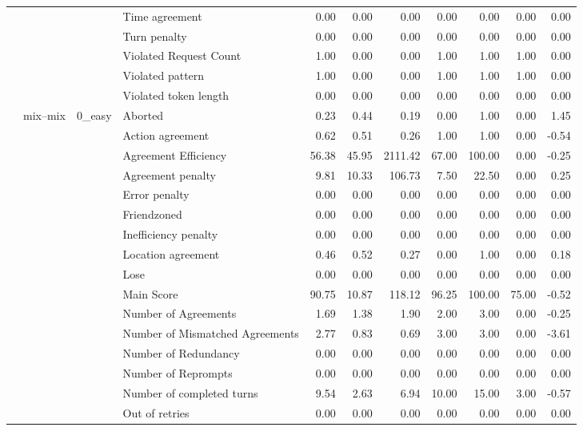 \begin{tabular}{llllrrrrrrr}
 &  &  & Time agreement & 0.00 & 0.00 & 0.00 & 0.00 & 0.00 & 0.00 & 0.00 \\
 &  &  & Turn penalty & 0.00 & 0.00 & 0.00 & 0.00 & 0.00 & 0.00 & 0.00 \\
 &  &  & Violated Request Count & 1.00 & 0.00 & 0.00 & 1.00 & 1.00 & 1.00 & 0.00 \\
 &  &  & Violated pattern & 1.00 & 0.00 & 0.00 & 1.00 & 1.00 & 1.00 & 0.00 \\
 &  &  & Violated token length & 0.00 & 0.00 & 0.00 & 0.00 & 0.00 & 0.00 & 0.00 \\
\cline{2-11} \cline{3-11}
 & \multirow[t]{216}{*}{mix--mix} & \multirow[t]{27}{*}{0_easy} & Aborted & 0.23 & 0.44 & 0.19 & 0.00 & 1.00 & 0.00 & 1.45 \\
 &  &  & Action agreement & 0.62 & 0.51 & 0.26 & 1.00 & 1.00 & 0.00 & -0.54 \\
 &  &  & Agreement Efficiency & 56.38 & 45.95 & 2111.42 & 67.00 & 100.00 & 0.00 & -0.25 \\
 &  &  & Agreement penalty & 9.81 & 10.33 & 106.73 & 7.50 & 22.50 & 0.00 & 0.25 \\
 &  &  & Error penalty & 0.00 & 0.00 & 0.00 & 0.00 & 0.00 & 0.00 & 0.00 \\
 &  &  & Friendzoned & 0.00 & 0.00 & 0.00 & 0.00 & 0.00 & 0.00 & 0.00 \\
 &  &  & Inefficiency penalty & 0.00 & 0.00 & 0.00 & 0.00 & 0.00 & 0.00 & 0.00 \\
 &  &  & Location agreement & 0.46 & 0.52 & 0.27 & 0.00 & 1.00 & 0.00 & 0.18 \\
 &  &  & Lose & 0.00 & 0.00 & 0.00 & 0.00 & 0.00 & 0.00 & 0.00 \\
 &  &  & Main Score & 90.75 & 10.87 & 118.12 & 96.25 & 100.00 & 75.00 & -0.52 \\
 &  &  & Number of Agreements & 1.69 & 1.38 & 1.90 & 2.00 & 3.00 & 0.00 & -0.25 \\
 &  &  & Number of Mismatched Agreements & 2.77 & 0.83 & 0.69 & 3.00 & 3.00 & 0.00 & -3.61 \\
 &  &  & Number of Redundancy & 0.00 & 0.00 & 0.00 & 0.00 & 0.00 & 0.00 & 0.00 \\
 &  &  & Number of Reprompts & 0.00 & 0.00 & 0.00 & 0.00 & 0.00 & 0.00 & 0.00 \\
 &  &  & Number of completed turns & 9.54 & 2.63 & 6.94 & 10.00 & 15.00 & 3.00 & -0.57 \\
 &  &  & Out of retries & 0.00 & 0.00 & 0.00 & 0.00 & 0.00 & 0.00 & 0.00 \\

\end{tabular}
